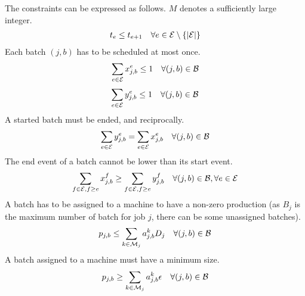 The constraints can be expressed as follows. $M$ denotes a
sufficiently large integer.
\begin{eqnarray}
t_e\leq t_{e+1}\quad\forall e\in{\cal E}\setminus\{|{\cal
  E}|\}\label{ct:see:1}
\end{eqnarray}
Each batch $(j,b)$ has to be scheduled at most once.
\begin{eqnarray}
\sum_{e\in{\cal E}}x_{j,b}^e\leq1 \quad \forall (j,b)\in{\cal B}
\end{eqnarray}
\begin{eqnarray}
\sum_{e\in{\cal E}}y_{j,b}^e\leq 1 \quad \forall (j,b)\in{\cal B}
\end{eqnarray}
A started batch must be ended, and reciprocally.
\begin{eqnarray}
\sum_{e\in{\cal E}}y_{j,b}^e=\sum_{e\in{\cal E}}x_{j,b}^e \quad
\forall (j,b)\in{\cal B}
\end{eqnarray}
The end event of a batch cannot be lower than its start event.
\begin{eqnarray}
\sum_{f\in{\cal E},f\geq e}x^f_{j,b}\geq \sum_{f\in{\cal E},f\geq
  e}y^f_{j,b}\quad \forall (j,b)\in{\cal B}, \forall e\in{\cal E}
\end{eqnarray}
A batch has to be assigned to a machine to have a non-zero production
(as $B_j$ is the maximum number of batch for job $j$, there can be
some unassigned batches).
\begin{eqnarray}
p_{j,b}\leq\sum_{k\in{\cal M}_j}a_{j,b}^kD_j\quad \forall
(j,b)\in{\cal B}
\end{eqnarray}
A batch assigned to a machine must have a minimum size.
\begin{eqnarray}
p_{j,b}\geq\sum_{k\in{\cal M}_j}a_{j,b}^k\epsilon\quad \forall
(j,b)\in{\cal B}
\end{eqnarray}

